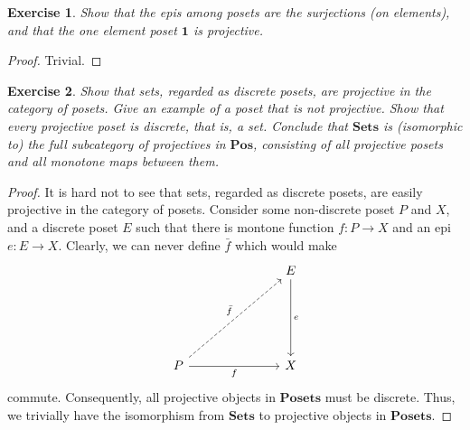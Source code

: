 \documentclass[a4paper, 11pt]{book}
\theoremstyle{plain}
\newtheorem{exercise}{Exercise}[chapter]
\theoremstyle{plain}
\newcommand{\mb}{\mathbf}
\newcommand{\arr}{\rightarrow}
\begin{document}
  \begin{exercise}
    Show that the epis among posets are the surjections (on elements), and that the one element poset $\mb{1}$ is projective.
  \end{exercise}
  \begin{proof}
    Trivial.
  \end{proof}

  \begin{exercise}
    Show that sets, regarded as discrete posets, are projective in the category of posets. Give an example of a poset that is not projective. Show that every projective poset is discrete, that is, a set. Conclude that $\mb{Sets}$ is (isomorphic to) the full subcategory of projectives in $\mb{Pos}$, consisting of all projective posets and all monotone maps between them.
  \end{exercise}
  \begin{proof}
    It is hard not to see that sets, regarded as discrete posets, are easily projective in the category of posets. Consider some non-discrete poset $P$ and $X$, and a discrete poset $E$ such that there is montone function $f:P \arr X$ and an epi $e:E \arr X$. Clearly, we can never define $\bar{f}$ which would make 
    \[\begin{tikzcd}
      &&& E \\
      &&& {} \\
      \\
      P &&& X
      \arrow["{\bar{f}}", dashed, from=4-1, to=1-4]
      \arrow["e", from=1-4, to=4-4]
      \arrow["f"', from=4-1, to=4-4]
    \end{tikzcd}\]
    commute. Consequently, all projective objects in $\mb{Posets}$ must be discrete. Thus, we trivially have the isomorphism from $\mb{Sets}$ to projective objects in $\mb{Posets}$.
  \end{proof}
\end{document}
